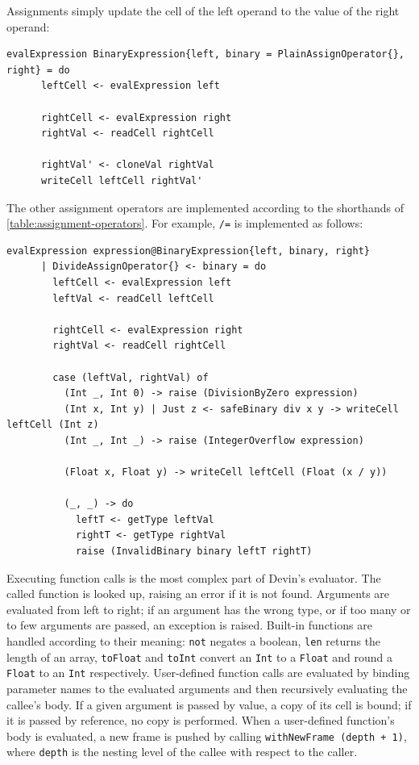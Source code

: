 \documentclass[UdineBachThesis,american,11pt]{PhdThesis}
\begin{document}
  Assignments simply update the cell of the left operand to the value of the
  right operand:

  \begin{Verbatim}[gobble=4,fontsize=\small]
    evalExpression BinaryExpression{left, binary = PlainAssignOperator{}, right} = do
      leftCell <- evalExpression left

      rightCell <- evalExpression right
      rightVal <- readCell rightCell

      rightVal' <- cloneVal rightVal
      writeCell leftCell rightVal'
  \end{Verbatim}

  The other assignment operators are implemented according to the shorthands of
  \autoref{table:assignment-operators}. For example, \mbox{\texttt{/=}} is
  implemented as follows:

  \begin{Verbatim}[gobble=4,fontsize=\small]
    evalExpression expression@BinaryExpression{left, binary, right}
      | DivideAssignOperator{} <- binary = do
        leftCell <- evalExpression left
        leftVal <- readCell leftCell

        rightCell <- evalExpression right
        rightVal <- readCell rightCell

        case (leftVal, rightVal) of
          (Int _, Int 0) -> raise (DivisionByZero expression)
          (Int x, Int y) | Just z <- safeBinary div x y -> writeCell leftCell (Int z)
          (Int _, Int _) -> raise (IntegerOverflow expression)

          (Float x, Float y) -> writeCell leftCell (Float (x / y))

          (_, _) -> do
            leftT <- getType leftVal
            rightT <- getType rightVal
            raise (InvalidBinary binary leftT rightT)
  \end{Verbatim}

  Executing function calls is the most complex part of Devin's evaluator. The
  called function is looked up, raising an error if it is not found. Arguments
  are evaluated from left to right; if an argument has the wrong type, or if too
  many or to few arguments are passed, an exception is raised. Built-in
  functions are handled according to their meaning: \mbox{\texttt{not}} negates
  a boolean, \mbox{\texttt{len}} returns the length of an array,
  \mbox{\texttt{toFloat}} and \mbox{\texttt{toInt}} convert an
  \mbox{\texttt{Int}} to a \mbox{\texttt{Float}} and round a
  \mbox{\texttt{Float}} to an \mbox{\texttt{Int}} respectively. User-defined
  function calls are evaluated by binding parameter names to the evaluated
  arguments and then recursively evaluating the callee's body. If a given
  argument is passed by value, a copy of its cell is bound; if it is passed by
  reference, no copy is performed. When a user-defined function's body is
  evaluated, a new frame is pushed by calling
  \mbox{\texttt{withNewFrame (depth + 1)}}, where \mbox{\texttt{depth}} is the
  nesting level of the callee with respect to the caller.
\end{document}
